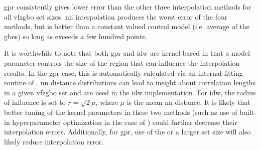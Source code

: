 \documentclass[final,twocolumn,12pt]{elsarticle}
\begin{document}
\Gls{gpr} consistently gives lower error than the other three interpolation methods for all \gls{vfzgbo} set sizes. 
\Gls{nn} interpolation produces the worst error of the four methods, but is better than a constant valued control model (i.e. average of the \inpt{} \glspl{gbe}) so long as  exceeds a few hundred \inpt{} points.

It is worthwhile to note that both \gls{gpr} and \gls{idw} are kernel-based in that a model parameter controls the size of the region that can influence the interpolation results. In the \gls{gpr} case, this is automatically calculated via an internal fitting routine of . \gls{nn} distance distributions can lead to insight about correlation lengths in a given \gls{vfzgbo} set and are used in the \gls{idw} implementation. For \gls{idw}, the radius of influence is set to $r=\sqrt{2} \mu$, where $\mu$ is the mean \gls{nn} distance. It is likely that better tuning of the kernel parameters in these two methods (such as use of built-in hyperparameter optimization in the case of ) could further decrease their interpolation errors. Additionally, for \gls{gpr}, use of the   or a larger  set size will also likely reduce interpolation error.
\end{document}
